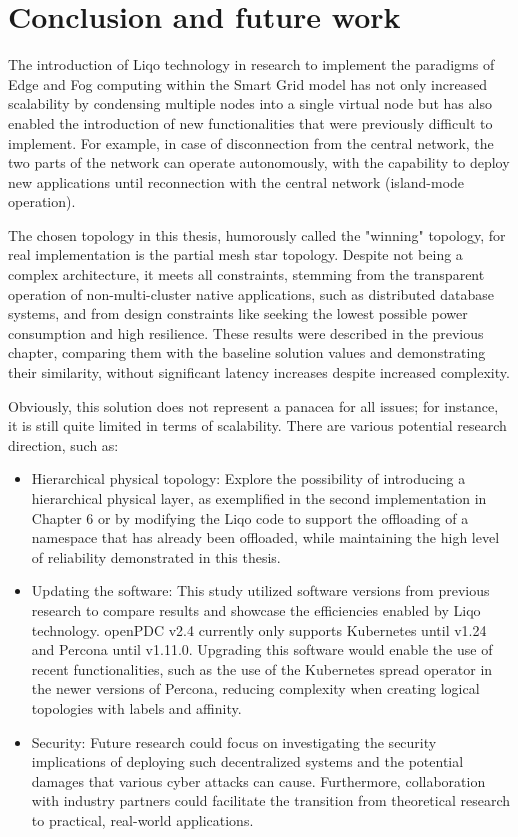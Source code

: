\chapter{Conclusion and future work}
The introduction of Liqo technology in research to implement the paradigms of Edge and Fog computing within the Smart Grid model has not only increased scalability by condensing multiple nodes into a single virtual node but has also enabled the introduction of new functionalities that were previously difficult to implement. For example, in case of disconnection from the central network, the two parts of the network can operate autonomously, with the capability to deploy new applications until reconnection with the central network (island-mode operation).

The chosen topology in this thesis, humorously called the "winning" topology, for real implementation is the partial mesh star topology. Despite not being a complex architecture, it meets all constraints, stemming from the transparent operation of non-multi-cluster native applications, such as distributed database systems, and from design constraints like seeking the lowest possible power consumption and high resilience. These results were described in the previous chapter, comparing them with the baseline solution values and demonstrating their similarity, without significant latency increases despite increased complexity.

Obviously, this solution does not represent a panacea for all issues; for instance, it is still quite limited in terms of scalability. There are various potential research direction, such as:

\begin{itemize}
\item Hierarchical physical topology: Explore the possibility of introducing a hierarchical physical layer, as exemplified in the second implementation in Chapter 6 or by modifying the Liqo code to support the offloading of a namespace that has already been offloaded, while maintaining the high level of reliability demonstrated in this thesis.
\item Updating the software: This study utilized software versions from previous research to compare results and showcase the efficiencies enabled by Liqo technology. openPDC v2.4 currently only supports Kubernetes until v1.24 and Percona until v1.11.0. Upgrading this software would enable the use of recent functionalities, such as the use of the Kubernetes spread operator in the newer versions of Percona, reducing complexity when creating logical topologies with labels and affinity. 
\item Security: Future research could focus on investigating the security implications of deploying such decentralized systems and the potential damages that various cyber attacks can cause. Furthermore, collaboration with industry partners could facilitate the transition from theoretical research to practical, real-world applications.
\end{itemize} 

